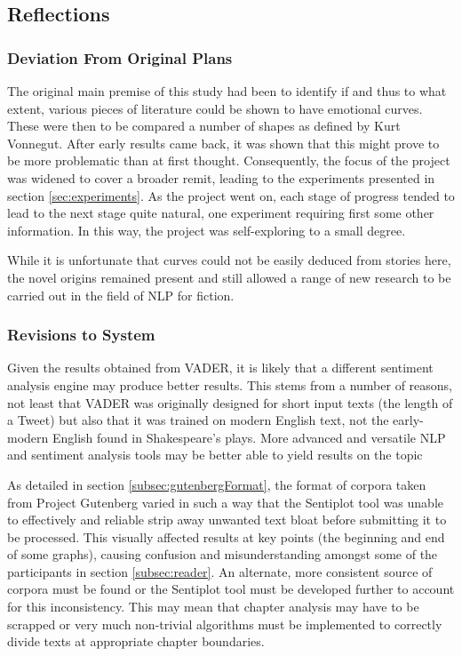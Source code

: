 \documentclass{article}
\begin{document}
    \subsection{Reflections}
        \subsubsection{Deviation From Original Plans}
            The original main premise of this study had been to identify if and thus to what extent, various pieces of literature could be shown to have emotional curves. These were then to be compared a number of shapes as defined by Kurt Vonnegut. After early results came back, it was shown that this might prove to be more problematic than at first thought. Consequently, the focus of the project was widened to cover a broader remit, leading to the experiments presented in section \ref{sec:experiments}. As the project went on, each stage of progress tended to lead to the next stage quite natural, one experiment requiring first some other information. In this way, the project was self-exploring to a small degree.

            While it is unfortunate that curves could not be easily deduced from stories here, the novel origins remained present and still allowed a range of new research to be carried out in the field of NLP for fiction.
        \subsubsection{Revisions to System}
            Given the results obtained from VADER, it is likely that a different sentiment analysis engine may produce better results. This stems from a number of reasons, not least that VADER was originally designed for short input texts (the length of a Tweet) but also that it was trained on modern English text, not the early-modern English found in Shakespeare's plays. More advanced and versatile NLP and sentiment analysis tools may be better able to yield results on the topic

            As detailed in section \ref{subsec:gutenbergFormat}, the format of corpora taken from Project Gutenberg varied in such a way that the Sentiplot tool was unable to effectively and reliable strip away unwanted text bloat before submitting it to be processed. This visually affected results at key points (the beginning and end of some graphs), causing confusion and misunderstanding amongst some of the participants in section \ref{subsec:reader}. An alternate, more consistent source of corpora must be found or the Sentiplot tool must be developed further to account for this inconsistency. This may mean that chapter analysis may have to be scrapped or very much non-trivial algorithms must be implemented to correctly divide texts at appropriate chapter boundaries.
\end{document}
